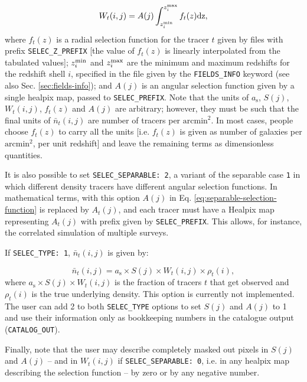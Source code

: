 \documentclass[12pt]{book} %
\begin{document}
\begin{equation}
W_t(i,j) = A(j)\int_{z^{\rm{min}}_i}^{z^{\rm{max}}_i} f_t(z) \rm{d}z,  
\label{eq:separable-selection-function} 
\end{equation}
where $f_t(z)$ is a radial selection function for the tracer $t$ 
given by files with prefix {\tt SELEC\_Z\_PREFIX} [the value of $f_t(z)$ 
is linearly interpolated from the tabulated values]; $z^{\rm{min}}_i$ and 
$z^{\rm{max}}_i$ are the minimum and maximum redshifts for the redshift shell $i$, 
specified in the file given by the {\tt FIELDS\_INFO} keyword (see also Sec. 
\ref{sec:fields-info}); and $A(j)$ is an 
angular selection function given by a single {\sc healpix} map, passed to {\tt SELEC\_PREFIX}. 
Note that the units of $a_{\mathrm{s}}$, $S(j)$, $W_t(i,j)$, $f_t(z)$ and $A(j)$ are arbitrary; 
however, they must be such that the final units of $\bar{n}_t(i,j)$ are number of tracers 
per $\mathrm{arcmin}^2$. In most cases, people choose $f_t(z)$ to carry 
all the units [i.e. $f_t(z)$ is given as number of galaxies per $\mathrm{arcmin}^2$, 
per unit redshift] and leave the remaining terms as dimensionless quantities.

It is also possible to set {\tt SELEC\_SEPARABLE: 2}, a variant of the separable case {\tt 1} in 
which different density tracers have different angular selection functions. In mathematical 
terms, with this option $A(j)$ in Eq. \ref{eq:separable-selection-function} is replaced by 
$A_t(j)$, and each tracer must have a Healpix map representing $A_t(j)$ with prefix given by 
{\tt SELEC\_PREFIX}. This allows, for instance, the correlated simulation of multiple surveys.

If {\tt SELEC\_TYPE: 1}, $\bar{n}_t(i,j)$ is given by:

\begin{equation}
\bar{n}_t(i,j) = a_{\mathrm{s}} \times S(j) \times W_t(i,j) \times \rho_t(i),
\label{eq:fraction-selection-function} 
\end{equation}
where $a_{\mathrm{s}} \times S(j) \times W_t(i,j)$ is the fraction of tracers $t$ 
that get observed and $\rho_t(i)$ is the true underlying density. This option is 
currently not implemented. The user can add 2 to both {\tt SELEC\_TYPE} options 
to set $S(j)$ and $A(j)$ to 1 and use their information only as bookkeeping numbers 
in the catalogue output ({\tt CATALOG\_OUT}). 

Finally, note that the user may describe completely masked out pixels in $S(j)$ and $A(j)$  
-- and in $W_t(i,j)$ if {\tt SELEC\_SEPARABLE: 0}, i.e. in any {\sc healpix} map describing the 
selection function -- by zero or by any negative number.
\end{document}
